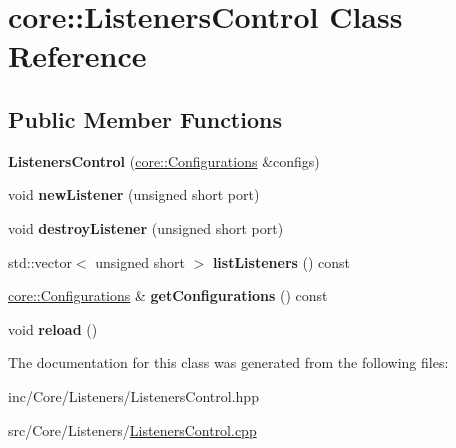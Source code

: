\hypertarget{classcore_1_1ListenersControl}{}\section{core\+:\+:Listeners\+Control Class Reference}
\label{classcore_1_1ListenersControl}
\subsection*{Public Member Functions}
\begin{DoxyCompactItemize}
\item 
\mbox{\label{classcore_1_1ListenersControl_a48d93238c04cbb842dd2b34d47a3a11b}} 
{\bfseries Listeners\+Control} (\hyperlink{classcore_1_1Configurations}{core\+::\+Configurations} \&configs)
\item 
\mbox{\label{classcore_1_1ListenersControl_a7ec19f83caf8f35401882f7cc5a9e76a}} 
void {\bfseries new\+Listener} (unsigned short port)
\item 
\mbox{\label{classcore_1_1ListenersControl_a9bd9b594fe3fcc64cacc19278de86f6c}} 
void {\bfseries destroy\+Listener} (unsigned short port)
\item 
\mbox{\label{classcore_1_1ListenersControl_a6e35cf8d500dc349557f1629d1e639ad}} 
std\+::vector$<$ unsigned short $>$ {\bfseries list\+Listeners} () const
\item 
\mbox{\label{classcore_1_1ListenersControl_a35885886edf981d3402cf4a15b9bf27b}} 
\hyperlink{classcore_1_1Configurations}{core\+::\+Configurations} \& {\bfseries get\+Configurations} () const
\item 
\mbox{\label{classcore_1_1ListenersControl_aab16c3b2cf3c0b491043d53da4ee60aa}} 
void {\bfseries reload} ()
\end{DoxyCompactItemize}


The documentation for this class was generated from the following files\+:\begin{DoxyCompactItemize}
\item 
inc/\+Core/\+Listeners/Listeners\+Control.\+hpp\item 
src/\+Core/\+Listeners/\hyperlink{ListenersControl_8cpp}{Listeners\+Control.\+cpp}\end{DoxyCompactItemize}
